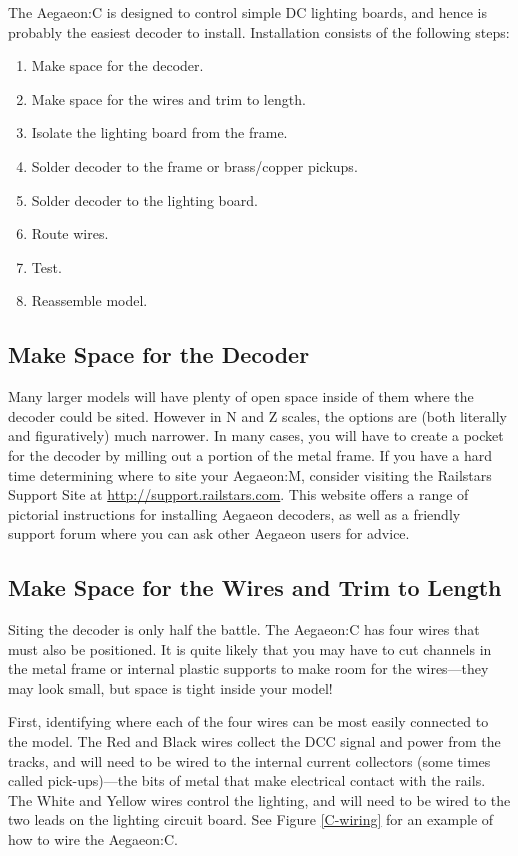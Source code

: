 \documentclass[12pt,letterpaper,draft]{memoir} %
\begin{document}
The Aegaeon:C is designed to control simple DC lighting boards, and hence is probably the easiest decoder to install. Installation consists of the following steps:
\begin{enumerate}
\item Make space for the decoder.
\item Make space for the wires and trim to length.
\item Isolate the lighting board from the frame.
\item Solder decoder to the frame or brass/copper pickups.
\item Solder decoder to the lighting board.
\item Route wires.
\item Test.
\item Reassemble model.
\end{enumerate}

\subsection{Make Space for the Decoder}
Many larger models will have plenty of open space inside of them where the decoder could be sited. However in N and Z scales, the options are (both literally and figuratively) much narrower. In many cases, you will have to create a pocket for the decoder by milling out a portion of the metal frame. If you have a hard time determining where to site your Aegaeon:M, consider visiting the Railstars Support Site at \url{http://support.railstars.com}. This website offers a range of pictorial instructions for installing Aegaeon decoders, as well as a friendly support forum where you can ask other Aegaeon users for advice.

\subsection{Make Space for the Wires and Trim to Length}
Siting the decoder is only half the battle. The Aegaeon:C has four wires that must also be positioned. It is quite likely that you may have to cut channels in the metal frame or internal plastic supports to make room for the wires---they may look small, but space is tight inside your model!

First, identifying where each of the four wires can be most easily connected to the model. The Red and Black wires collect the DCC signal and power from the tracks, and will need to be wired to the internal current collectors (some times called pick-ups)---the bits of metal that make electrical contact with the rails. The White and Yellow wires control the lighting, and will need to be wired to the two leads on the lighting circuit board. See Figure \ref{C-wiring} for an example of how to wire the Aegaeon:C.
\end{document}
